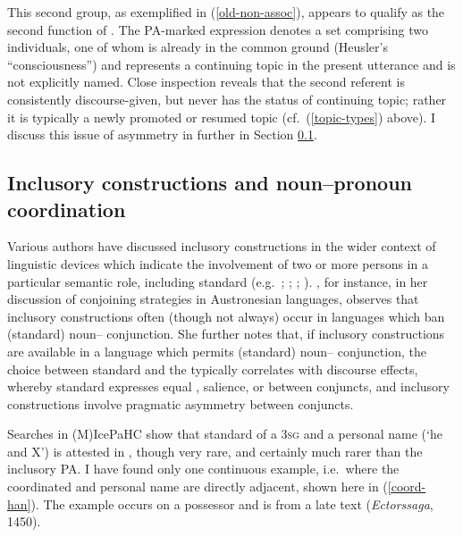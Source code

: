 \documentclass[output=paper,colorlinks,citecolor=brown]{langscibook}
\begin{document}
This second group, as exemplified in (\ref{old-non-assoc}), appears to qualify as the second function of \citet{heusler1962altislandisches}. The PA-marked expression denotes a set comprising two individuals, one of whom is already in the common ground (Heusler's ``consciousness'') and represents a continuing topic in the present utterance and is not explicitly named. Close inspection reveals that the second referent is consistently discourse-given, but never has the status of continuing topic; rather it is typically a newly promoted or resumed topic (cf.~(\ref{topic-types}) above). I discuss this issue of asymmetry in  further in Section \ref{subsect:incl-coord}.

\subsection{Inclusory constructions and noun--pronoun coordination}\label{subsect:incl-coord}

Various authors have discussed inclusory constructions in the wider context of linguistic devices which indicate the involvement of two or more persons in a particular semantic role, including standard  (e.g.~\citealp{bhat2004conjunction}; \citealp{gaby2005some}; \citealp{haspelmath2007coordination}; \citealp{bril2011noun}). 
\citet{bril2011noun}, for instance, in her discussion of conjoining strategies in Austronesian languages, observes that inclusory constructions often (though not always) occur in languages which ban (standard) noun-- conjunction. She further notes that, if inclusory constructions are available in a language which permits (standard) noun-- conjunction, the choice between standard  and the  typically correlates with discourse effects, whereby standard  expresses equal , salience, or  between conjuncts, and inclusory constructions involve pragmatic asymmetry between conjuncts.

Searches in (M)IcePaHC show that standard  of a 3\textsc{sg}  and a personal name  (`he and X') is attested in , though very rare, and certainly much rarer than the inclusory PA. I have found only one continuous example, i.e.~where the coordinated  and personal name are directly adjacent, shown here in (\ref{coord-han}).  
The example occurs on a possessor and is from a late text (\textit{Ectorssaga}, 1450).
\end{document}
